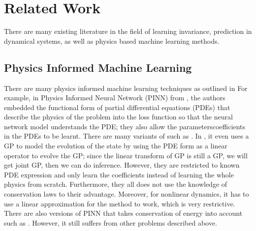 \documentclass{statsmsc}
\begin{document}
\section{Related Work}
There are many existing literature in the field of learning invariance, prediction in dynamical systems, as well as physics based machine learning methods.

\subsection{Physics Informed Machine Learning}
There are many physics informed machine learning techniques as outlined in \cite{Cuomo2022, PIML}
For example, in Physics Informed Neural Network (PINN) from \cite{Raissi2019}, the authors embedded the functional form of partial differential equations (PDEs) that describe the physics of the problem into the loss function so that the neural network model understands the PDE; they also allow the parameters\/coefficients in the PDEs to be learnt. 
There are many variants of such as \cite{Qian2020}.
In \cite{Raissi2018}, it even uses a GP to model the evolution of the state by using the PDE form as a linear operator to evolve the GP; since the linear transform of GP is still a GP, we will get joint GP, then we can do inference.
However, they are restricted to known PDE expression and only learn the coefficients instead of learning the whole physics from scratch. 
Furthermore, they all does not use the knowledge of conservation laws to their advantage.
Moreover, for nonlinear dynamics, it has to use a linear approximation for the method to work, which is very restrictive.
There are also versions of PINN that takes conservation of energy into account such as \cite{Jagtap2020}.
However, it still suffers from other problems described above.
\end{document}
